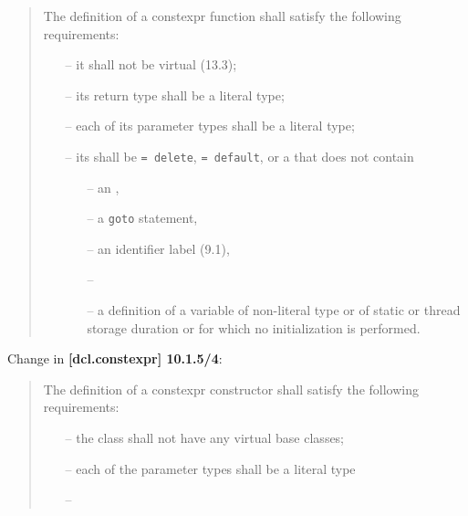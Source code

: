 \documentclass{wg21}
\begin{document}
\begin{quote}
  The definition of a constexpr function shall satisfy the following requirements:
  \begin{itemize}
    \item[--] it shall not be virtual (13.3);
    \item[--] its return type shall be a literal type;
    \item[--] each of its parameter types shall be a literal type;
    \item[--] its  shall be \texttt{= delete},
              \texttt{= default}, or a  that
              does not contain
      \begin{itemize}
        \item[--] an ,
        \item[--] a \texttt{goto} statement,
        \item[--] an identifier label (9.1),
        \item[--] 
        \item[--] a definition of a variable of non-literal type or of static
                  or thread storage duration or for which no initialization is
                  performed.
      \end{itemize}
  \end{itemize}
\end{quote}

Change in \textbf{[dcl.constexpr] 10.1.5/4}:

\begin{quote}
  The definition of a constexpr constructor shall satisfy the following requirements:
  \begin{itemize}
    \item[--] the class shall not have any virtual base classes;
    \item[--] each of the parameter types shall be a literal type\removed{;}
    \item[--] 
  \end{itemize}
\end{quote}
\end{document}
